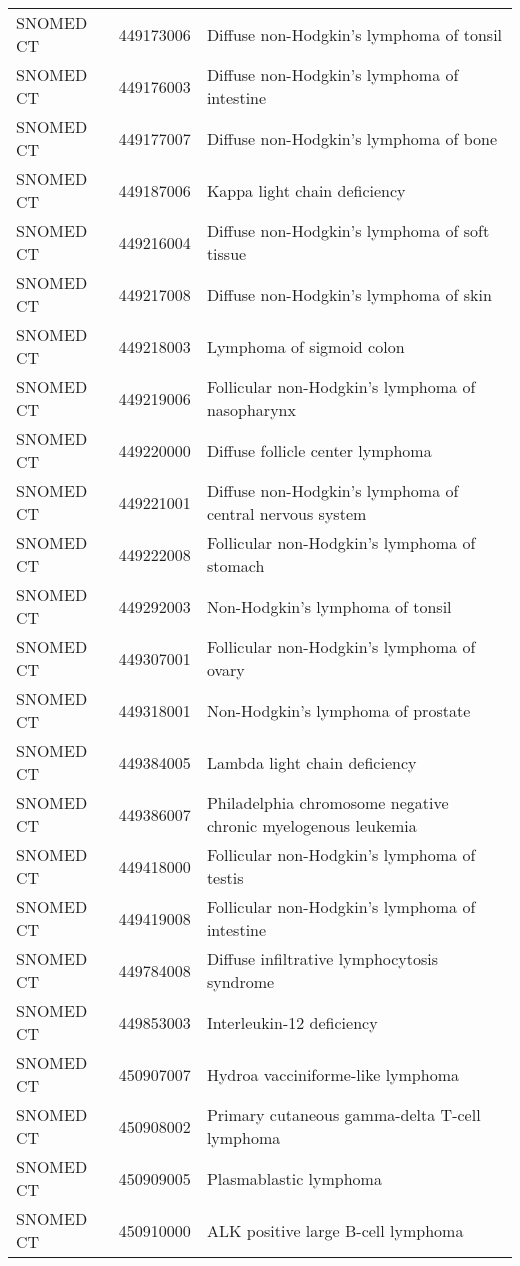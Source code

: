 \begin{table}[ht]
\begin{tabular}{lll}
  SNOMED CT & 449173006 & Diffuse non-Hodgkin's lymphoma of tonsil \\ 
  SNOMED CT & 449176003 & Diffuse non-Hodgkin's lymphoma of intestine \\ 
  SNOMED CT & 449177007 & Diffuse non-Hodgkin's lymphoma of bone \\ 
  SNOMED CT & 449187006 & Kappa light chain deficiency \\ 
  SNOMED CT & 449216004 & Diffuse non-Hodgkin's lymphoma of soft tissue \\ 
  SNOMED CT & 449217008 & Diffuse non-Hodgkin's lymphoma of skin \\ 
  SNOMED CT & 449218003 & Lymphoma of sigmoid colon \\ 
  SNOMED CT & 449219006 & Follicular non-Hodgkin's lymphoma of nasopharynx \\ 
  SNOMED CT & 449220000 & Diffuse follicle center lymphoma \\ 
  SNOMED CT & 449221001 & Diffuse non-Hodgkin's lymphoma of central nervous system \\ 
  SNOMED CT & 449222008 & Follicular non-Hodgkin's lymphoma of stomach \\ 
  SNOMED CT & 449292003 & Non-Hodgkin's lymphoma of tonsil \\ 
  SNOMED CT & 449307001 & Follicular non-Hodgkin's lymphoma of ovary \\ 
  SNOMED CT & 449318001 & Non-Hodgkin's lymphoma of prostate \\ 
  SNOMED CT & 449384005 & Lambda light chain deficiency \\ 
  SNOMED CT & 449386007 & Philadelphia chromosome negative chronic myelogenous leukemia \\ 
  SNOMED CT & 449418000 & Follicular non-Hodgkin's lymphoma of testis \\ 
  SNOMED CT & 449419008 & Follicular non-Hodgkin's lymphoma of intestine \\ 
  SNOMED CT & 449784008 & Diffuse infiltrative lymphocytosis syndrome \\ 
  SNOMED CT & 449853003 & Interleukin-12 deficiency \\ 
  SNOMED CT & 450907007 & Hydroa vacciniforme-like lymphoma \\ 
  SNOMED CT & 450908002 & Primary cutaneous gamma-delta T-cell lymphoma \\ 
  SNOMED CT & 450909005 & Plasmablastic lymphoma \\ 
  SNOMED CT & 450910000 & ALK positive large B-cell lymphoma \\ 

\end{tabular}
\end{table}
